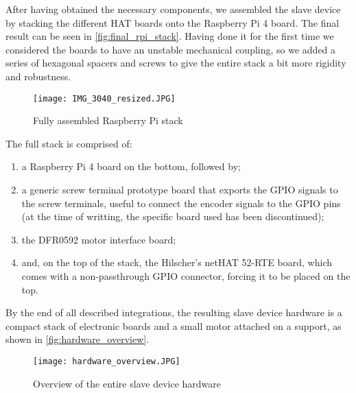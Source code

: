 After having obtained the necessary components, we assembled the slave device by stacking the different HAT boards onto the Raspberry Pi 4 board.
The final result can be seen in \autoref{fig:final_rpi_stack}.
Having done it for the first time we considered the boards to have an unstable mechanical coupling, so we added a series of hexagonal spacers and screws to give the entire stack a bit more rigidity and robustness.

\begin{figure}[htp]
	\centering
	\texttt{[image: IMG\_3040\_resized.JPG]}
	\caption{Fully assembled Raspberry Pi stack}
	\label{fig:final_rpi_stack}
\end{figure}

The full stack is comprised of:
\begin{enumerate}
	\item a Raspberry Pi 4 board \cite{product:rpi4} on the bottom, followed by;
	\item a generic screw terminal prototype board that exports the GPIO signals to the screw terminals, useful to connect the encoder signals to the GPIO pins (at the time of writting, the specific board used has been discontinued);
	\item the DFR0592 motor interface board;
	\item and, on the top of the stack, the Hilscher's netHAT 52-RTE board, which comes with a non-passthrough GPIO connector, forcing it to be placed on the top.
\end{enumerate}

By the end of all described integrations, the resulting slave device hardware is a compact stack of electronic boards and a small motor attached on a support, as shown in \autoref{fig:hardware_overview}.

\begin{figure}[htp]
	\centering
	\texttt{[image: hardware\_overview.JPG]}
	\caption{Overview of the entire slave device hardware}
	\label{fig:hardware_overview}
\end{figure}
